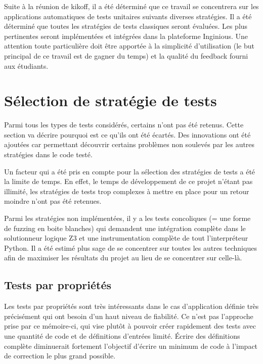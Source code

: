 \documentclass[a4paper]{report}
\begin{document}
Suite à la réunion de kikoff, il a été déterminé que ce travail se concentrera sur les applications automatiques de tests unitaires suivants diverses stratégies.
Il a été déterminé que toutes les stratégies de tests classiques seront évaluées.
Les plus pertinentes seront implémentées et intégrées dans la plateforme Inginious.
Une attention toute particulière doit être apportée à la simplicité d’utilisation (le but principal de ce travail est de gagner du temps) et la qualité du feedback fourni aux étudiants.
 
 
\section{Sélection de stratégie de tests}

Parmi tous les types de tests considérés, certains n'ont pas été retenus.
Cette section va décrire pourquoi est ce qu'ils ont été écartés.
Des innovations ont été ajoutées car permettant découvrir certains problèmes non soulevés par les autres stratégies dans le code testé.

Un facteur qui  a été pris en compte pour la sélection des stratégies de tests a été la limite de temps.
En effet, le temps de développement de ce projet n'étant pas illimité, les stratégies de tests trop complexes à mettre en place pour un retour moindre n'ont pas été retenues.

Parmi les stratégies non implémentées, il y a les tests concoliques (= une forme de fuzzing en boite blanches) qui demandent une intégration complète dans le solutionneur logique Z3 et une instrumentation complète de tout l'interpréteur Python.
Il a été estimé plus sage de se concentrer sur toutes les autres techniques afin de maximiser les résultats du projet au lieu de se concentrer sur celle-là.


\subsection{Tests par propriétés}

Les tests par propriétés sont très intéressants dans le cas d'application définie très précisément qui ont besoin d'un haut niveau de fiabilité.
Ce n'est pas l'approche prise par ce mémoire-ci, qui vise plutôt à pouvoir créer rapidement des tests avec une quantité de code et de définitions d'entrées limité.
Écrire des définitions complète diminuerait fortement l'objectif d'écrire un minimum de code à l'impact de correction le plus grand possible.
\end{document}
